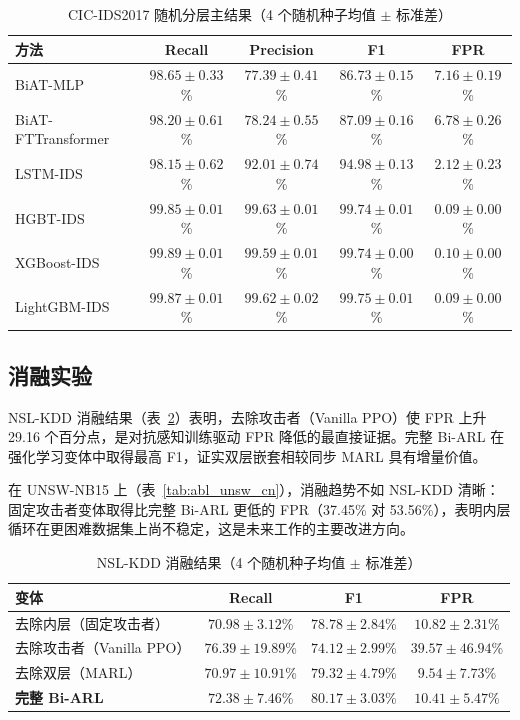 \documentclass[12pt,a4paper]{ctexart}
\begin{document}
\begin{table}[H]
\centering
\caption{CIC-IDS2017 随机分层主结果（4 个随机种子均值 $\pm$ 标准差）}
\label{tab:cic_cn}
\begin{tabular}{lcccc}
\toprule
\textbf{方法} & \textbf{Recall} & \textbf{Precision} & \textbf{F1} & \textbf{FPR} \\
\midrule
BiAT-MLP & $98.65{\pm}0.33$\% & $77.39{\pm}0.41$\% & $86.73{\pm}0.15$\% & $7.16{\pm}0.19$\% \\
BiAT-FTTransformer & $98.20{\pm}0.61$\% & $78.24{\pm}0.55$\% & $87.09{\pm}0.16$\% & $6.78{\pm}0.26$\% \\
LSTM-IDS & $98.15{\pm}0.62$\% & $92.01{\pm}0.74$\% & $94.98{\pm}0.13$\% & $2.12{\pm}0.23$\% \\
HGBT-IDS & $99.85{\pm}0.01$\% & $99.63{\pm}0.01$\% & $99.74{\pm}0.01$\% & $\mathbf{0.09{\pm}0.00}$\% \\
XGBoost-IDS & $\mathbf{99.89{\pm}0.01}$\% & $99.59{\pm}0.01$\% & $99.74{\pm}0.00$\% & $0.10{\pm}0.00$\% \\
LightGBM-IDS & $99.87{\pm}0.01$\% & $\mathbf{99.62{\pm}0.02}$\% & $\mathbf{99.75{\pm}0.01}$\% & $\mathbf{0.09{\pm}0.00}$\% \\
\bottomrule
\end{tabular}
\end{table}

\subsection{消融实验}

NSL-KDD 消融结果（表~\ref{tab:abl_nsl_cn}）表明，去除攻击者（Vanilla PPO）使 FPR 上升 29.16 个百分点，是对抗感知训练驱动 FPR 降低的最直接证据。完整 Bi-ARL 在强化学习变体中取得最高 F1，证实双层嵌套相较同步 MARL 具有增量价值。

在 UNSW-NB15 上（表~\ref{tab:abl_unsw_cn}），消融趋势不如 NSL-KDD 清晰：固定攻击者变体取得比完整 Bi-ARL 更低的 FPR（37.45\% 对 53.56\%），表明内层循环在更困难数据集上尚不稳定，这是未来工作的主要改进方向。

\begin{table}[H]
\centering
\caption{NSL-KDD 消融结果（4 个随机种子均值 $\pm$ 标准差）}
\label{tab:abl_nsl_cn}
\begin{tabular}{lccc}
\toprule
\textbf{变体} & \textbf{Recall} & \textbf{F1} & \textbf{FPR} \\
\midrule
去除内层（固定攻击者）& $70.98{\pm}3.12$\% & $78.78{\pm}2.84$\% & $10.82{\pm}2.31$\% \\
去除攻击者（Vanilla PPO）& $\mathbf{76.39{\pm}19.89}$\% & $74.12{\pm}2.99$\% & $39.57{\pm}46.94$\% \\
去除双层（MARL）& $70.97{\pm}10.91$\% & $79.32{\pm}4.79$\% & $\mathbf{9.54{\pm}7.73}$\% \\
\midrule
\textbf{完整 Bi-ARL} & $72.38{\pm}7.46$\% & $\mathbf{80.17{\pm}3.03}$\% & $10.41{\pm}5.47$\% \\
\bottomrule
\end{tabular}
\end{table}
\end{document}
